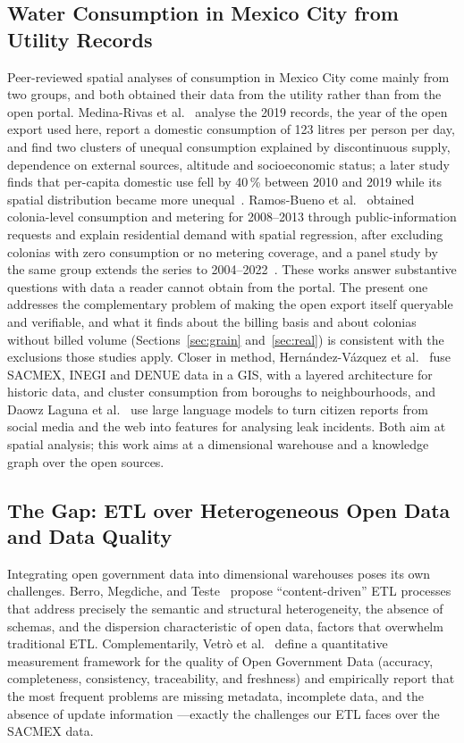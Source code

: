 \documentclass[runningheads]{llncs}
\newenvironment{nuevobloque}{}{}
\renewcommand{\_}{\origunderscore\allowbreak}
\begin{document}
\begin{nuevobloque}
\subsection{Water Consumption in Mexico City from Utility Records}

Peer-reviewed spatial analyses of consumption in Mexico City come mainly from two
groups, and both obtained their data from the utility rather than from the open
portal. Medina-Rivas et al.~\cite{medina2022} analyse the 2019 records, the year
of the open export used here, report a domestic consumption of 123 litres per
person per day, and find two clusters of unequal consumption explained by
discontinuous supply, dependence on external sources, altitude and socioeconomic
status; a later study finds that per-capita domestic use fell by 40\,\% between
2010 and 2019 while its spatial distribution became more unequal~\cite{medina2025}.
Ramos-Bueno et al.~\cite{ramosbueno2021} obtained colonia-level consumption and
metering for 2008--2013 through public-information requests and explain
residential demand with spatial regression, after excluding colonias with zero
consumption or no metering coverage, and a panel study by the same group extends
the series to 2004--2022~\cite{ramosbueno2024}. These works answer substantive
questions with data a reader cannot obtain from the portal. The present one
addresses the complementary problem of making the open export itself queryable
and verifiable, and what it finds about the billing basis and about colonias
without billed volume (Sections~\ref{sec:grain} and~\ref{sec:real}) is consistent
with the exclusions those studies apply. Closer in method, Hern\'andez-V\'azquez et
al.~\cite{hernandez2026} fuse SACMEX, INEGI and DENUE data in a GIS, with a layered
architecture for historic data, and cluster consumption from boroughs to
neighbourhoods, and Daowz Laguna et al.~\cite{daowz2027} use large language models
to turn citizen reports from social media and the web into features for analysing
leak incidents. Both aim at spatial analysis; this work aims at a dimensional
warehouse and a knowledge graph over the open sources.
\end{nuevobloque}

\subsection{The Gap: ETL over Heterogeneous Open Data and Data Quality}

Integrating open government data into dimensional warehouses poses its own challenges. Berro, Megdiche, and Teste~\cite{berro2015} propose ``content-driven'' ETL processes that address precisely the semantic and structural heterogeneity, the absence of schemas, and the dispersion characteristic of open data, factors that overwhelm traditional ETL. Complementarily, Vetr\`o et al.~\cite{vetro2016} define a quantitative measurement framework for the quality of Open Government Data (accuracy, completeness, consistency, traceability, and freshness) and empirically report that the most frequent problems are missing metadata, incomplete data, and the absence of update information ---exactly the challenges our ETL faces over the SACMEX data.
\end{document}
